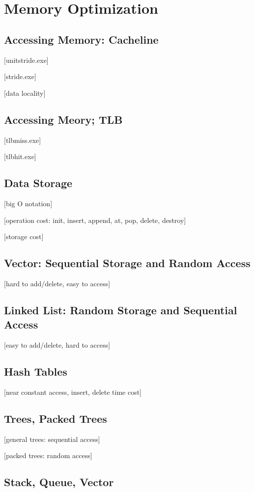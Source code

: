 \documentclass[main]{subfiles}
\begin{document}
\section{Memory Optimization}
\subsection{Accessing Memory: Cacheline}
[unitstride.exe]

[stride.exe]

[data locality]

\subsection{Accessing Meory; TLB}
[tlbmiss.exe]

[tlbhit.exe] 
\subsection{Data Storage}
[big O notation]

[operation cost: init, insert, append, at, pop, delete, destroy]

[storage cost]
\subsection{Vector: Sequential Storage and Random Access}
[hard to add/delete, easy to access]
\subsection{Linked List: Random Storage and Sequential Access}
[easy to add/delete, hard to access]
\subsection{Hash Tables}
[near constant access, insert, delete time cost]
\subsection{Trees, Packed Trees}
[general trees: sequential access]

[packed trees: random access]
\subsection{Stack, Queue, Vector}
\end{document}
